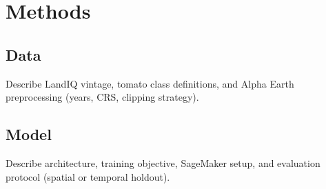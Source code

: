 \section{Methods}

\subsection{Data}
Describe LandIQ vintage, tomato class definitions, and Alpha Earth preprocessing (years, CRS, clipping strategy).

\subsection{Model}
Describe architecture, training objective, SageMaker setup, and evaluation protocol (spatial or temporal holdout).
